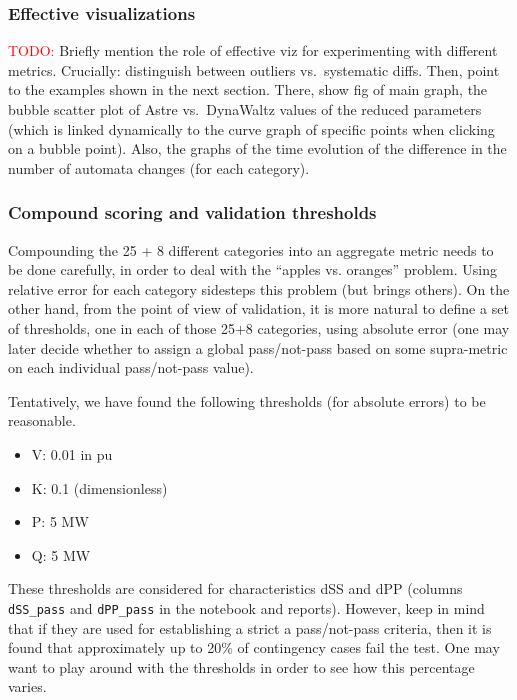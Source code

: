 \documentclass[conference]{IEEEtran}
\newcommand{\code}[1]{\texttt{#1}}
\begin{document}
\subsubsection{Effective visualizations}
\textcolor{red}{TODO:} Briefly mention the role of effective viz for
experimenting with different metrics. Crucially: distinguish between
outliers vs.\ systematic diffs.  Then, point to the examples shown in
the next section.  There, show fig of main graph, the bubble scatter
plot of Astre vs.\ DynaWaltz values of the reduced parameters (which
is linked dynamically to the curve graph of specific points when
clicking on a bubble point).  Also, the graphs of the time evolution
of the difference in the number of automata changes (for each
category).



\subsubsection{Compound scoring and validation thresholds}


Compounding the 25 + 8 different categories into an aggregate metric
needs to be done carefully, in order to deal with the ``apples vs. oranges''
problem. Using relative error for each category sidesteps this problem (but
brings others).  On the other hand, from the point of view of validation, it is
more natural to define a set of thresholds, one in each of those 25+8
categories, using absolute error (one may later decide whether to assign a
global pass/not-pass based on some supra-metric on each individual pass/not-pass
value).

Tentatively, we have found the following thresholds (for absolute
errors) to be reasonable.
\begin{itemize}
\item V: 0.01 in pu
\item K: 0.1 (dimensionless)
\item P: 5 MW
\item Q: 5 MW
\end{itemize}

These thresholds are considered for characteristics dSS and dPP
(columns \code{dSS\_pass} and \code{dPP\_pass} in the notebook and
reports).  However, keep in mind that if they are used for
establishing a strict a pass/not-pass criteria, then it is found that
approximately up to 20\% of contingency cases fail the test. One may
want to play around with the thresholds in order to see how this
percentage varies.
\end{document}
